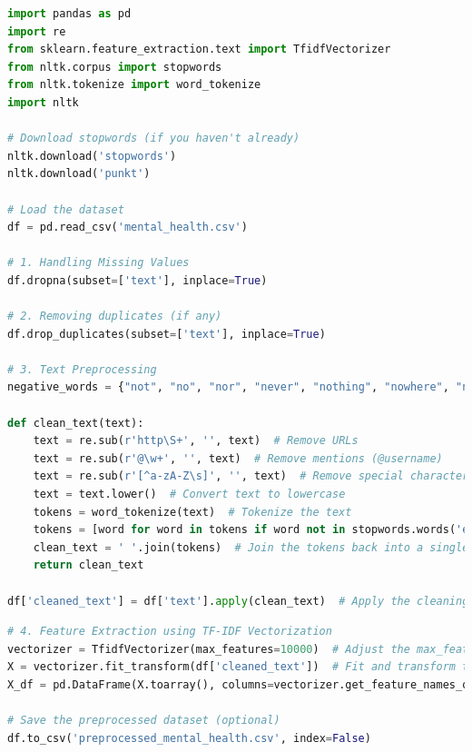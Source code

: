 \begin{tcolorbox}[colback=gray!5!white, colframe=gray!80!black, boxrule=0.5pt, title=Text Preprocessing]
    \begin{lstlisting}[language=Python]
import pandas as pd
import re
from sklearn.feature_extraction.text import TfidfVectorizer
from nltk.corpus import stopwords
from nltk.tokenize import word_tokenize
import nltk

# Download stopwords (if you haven't already)
nltk.download('stopwords')
nltk.download('punkt')

# Load the dataset
df = pd.read_csv('mental_health.csv')

# 1. Handling Missing Values
df.dropna(subset=['text'], inplace=True)

# 2. Removing duplicates (if any)
df.drop_duplicates(subset=['text'], inplace=True)

# 3. Text Preprocessing
negative_words = {"not", "no", "nor", "never", "nothing", "nowhere", "neither", "cannot", "n't", "without", "barely", "hardly", "scarcely"}

def clean_text(text):
    text = re.sub(r'http\S+', '', text)  # Remove URLs
    text = re.sub(r'@\w+', '', text)  # Remove mentions (@username)
    text = re.sub(r'[^a-zA-Z\s]', '', text)  # Remove special characters, numbers, and punctuations
    text = text.lower()  # Convert text to lowercase
    tokens = word_tokenize(text)  # Tokenize the text
    tokens = [word for word in tokens if word not in stopwords.words('english') or word in negative_words]  # Remove stopwords, but keep negative words
    clean_text = ' '.join(tokens)  # Join the tokens back into a single string
    return clean_text

df['cleaned_text'] = df['text'].apply(clean_text)  # Apply the cleaning function to the 'text' column

\end{lstlisting}
\end{tcolorbox}

\begin{tcolorbox}[colback=gray!5!white, colframe=gray!80!black, boxrule=0.5pt, title=Text Preprocessing]
\begin{lstlisting}[language=Python]
# 4. Feature Extraction using TF-IDF Vectorization
vectorizer = TfidfVectorizer(max_features=10000)  # Adjust the max_features
X = vectorizer.fit_transform(df['cleaned_text'])  # Fit and transform the cleaned text data
X_df = pd.DataFrame(X.toarray(), columns=vectorizer.get_feature_names_out())  # Convert the result to a DataFrame for easier understanding

# Save the preprocessed dataset (optional)
df.to_csv('preprocessed_mental_health.csv', index=False)
    \end{lstlisting}
\end{tcolorbox}

